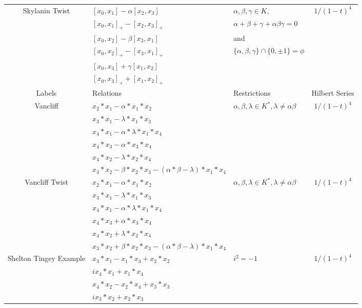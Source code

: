 \documentclass[12]{article}
\begin{document}
\begin{longtable}[c]{|c|p{5.25cm}|p{3.25cm}|c|}
\hline
Skylanin Twist & $  [x_0, x_1]  -  \alpha[x_2, x_3] $ &$ \alpha, \beta, \gamma \in K,$  &\multirow{6}{*}{$ 1/(1-t)^4 $} \\ 
 & $ [x_0, x_1]_+  -  [x_2, x_3]_+ $ &$\alpha + \beta + \gamma +\alpha \beta \gamma = 0 $ &  \\ 
   &$ [x_0, x_2] - \beta [x_3, x_1] $ & and & \\  
   & $ [x_0, x_2]_+ - [x_3, x_1]_+ $ & $ \{ \alpha, \beta, \gamma \} \cap \{0, \pm1\} = \phi $& \\  
   & $  [x_0, x_3] + \gamma [x_1, x_2] $ & & \\ 
   & $ [x_0, x_3]_+ + [x_1, x_2]_+ $ & &  \\  
\hline
\pagebreak
\midrule[1.0pt]
Labels & Relations & Restrictions & Hilbert Series \\
\hline
Vancliff & $ x_2*x_1 -  \alpha * x_1 * x_2 $ &\multirow{6}{*}{$\alpha, \beta, \lambda \in K^{*}, \lambda \neq \alpha \beta $} &\multirow{6}{*}{$ 1/(1-t)^4 $} \\ 
 & $ x_3*x_1 - \lambda * x_1*x_3 $ & &  \\ 
   & $ x_4*x_1 - \alpha * \lambda *  x_1*x_4 $ & & \\  
   & $ x_4*x_3 - \alpha *  x_3*x_4 $& & \\  
   & $ x_4*x_2 - \lambda * x_2*x_4 $ & & \\ 
   & $ x_3*x_2 - \beta * x_2*x_3 - ( \alpha * \beta - \lambda)* x_1*x_4 $ & &  \\  
\hline
Vancliff Twist &  $ x_2*x_1 -  \alpha * x_1*x_2 $ &\multirow{6}{*}{$\alpha, \beta, \lambda \in K^{*}, \lambda \neq \alpha \beta $} &\multirow{6}{*}{$ 1/(1-t)^4 $} \\ 
 & $ x_3*x_1 - \lambda * x_1*x_3 $ & &  \\ 
   & $ x_4*x_1 - \alpha * \lambda * x_1*x_4 $ & & \\  
   & $ x_4*x_3 + \alpha *  x_3*x_4 $& & \\  
   & $ x_4*x_2 +\lambda * x_2*x_4 $ & & \\ 
   & $ x_3*x_2 + \beta * x_2*x_3 - ( \alpha * \beta - \lambda)* x_1*x_4 $ & &  \\ 
\hline
Shelton Tingey Example & $ x_3 *x_1 - x_1* x_3 + x_2*x_2$ &\multirow{6}{*}{$ i^2 = -1 $} &\multirow{6}{*}{$ 1/(1-t)^4 $} \\ 
 & $ix_4*x_1 + x_1*x_4 $ & &  \\ 
   & $ x_4*x_2 - x_2*x_4 + x_3*x_3 $ & & \\  
   & $ ix_3*x_2 + x_2*x_3 $ & & \\  

\end{longtable}
\end{document}
